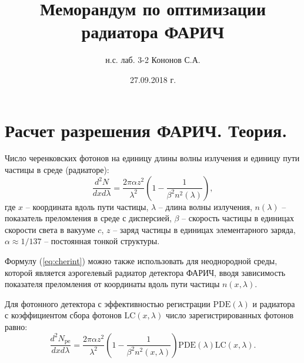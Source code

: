 \documentclass[12pt]{article}
\title{\Large\bf Меморандум по оптимизации радиатора ФАРИЧ}
\author{\large н.с. лаб. 3-2 Кононов С.А.}
\date{\large 27.09.2018 г.}
\begin{document}
\maketitle

\section{Расчет разрешения ФАРИЧ. Теория.}
Число черенковских фотонов на единицу длины волны излучения и единицу пути частицы в среде (радиаторе):
\begin{equation}
\frac{d^2N}{dx d\lambda} = \frac{2\pi\alpha z^2}{\lambda^2}\left(1 - \frac{1}{\beta^2 n^2(\lambda)}\right),
\label{eq:cherint}
\end{equation}
где $x$ -- координата вдоль пути частицы, $\lambda$ -- длина волны излучения,
$n(\lambda)$ -- показатель преломления в среде с дисперсией,
$\beta$ -- скорость частицы в единицах скорости света в вакууме $c$, $z$ -- заряд частицы в единицах элементарного заряда, 
$\alpha\approx 1/137$ -- постоянная тонкой структуры.

Формулу (\ref{eq:cherint}) можно также использовать для неоднородной среды, которой является аэрогелевый радиатор детектора ФАРИЧ, вводя
зависимость показателя преломления от координаты вдоль пути частицы $n(x,\lambda)$.

Для фотонного детектора с эффективностью регистрации $\mathrm{PDE}(\lambda)$ и радиатора с коэффициентом сбора 
фотонов $\mathrm{LC}(x,\lambda)$ число зарегистрированных фотонов равно:
\begin{equation}
\frac{d^2N_\mathrm{pe}}{dx d\lambda} = \frac{2\pi\alpha z^2}{\lambda^2}\left(1 - \frac{1}{\beta^2 n^2(x,\lambda)}\right)
\mathrm{PDE}(\lambda)\mathrm{LC}(x,\lambda).
\label{eq:cherintdet}
\end{equation}
\end{document}
